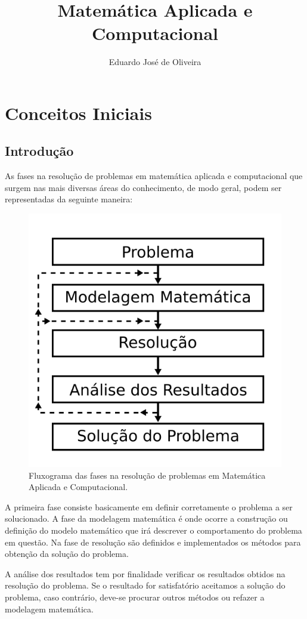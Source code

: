 \documentclass[12pt,a4paper]{book}
\title{Matemática Aplicada e Computacional}
\author{Eduardo José de Oliveira}
\numberwithin{example}{chapter}
\numberwithin{remark}{chapter}
\numberwithin{definition}{chapter}
\begin{document}
%
%
%
\chapter{Conceitos Iniciais}

\section{Introdução}

As fases na resolução de problemas em matemática aplicada e computacional que surgem nas mais diversas áreas do conhecimento, de modo geral, podem ser representadas da seguinte maneira:

\begin{figure}[h]
	\centering
	\includegraphics[scale=0.2]{figuras/figura_001}
	\caption{Fluxograma das fases na resolução de problemas em Matemática Aplicada e Computacional.}
\end{figure}

A primeira fase consiste basicamente em definir corretamente o problema a ser solucionado. A fase da modelagem matemática é onde ocorre a construção ou definição do modelo matemático que irá descrever o comportamento do problema em questão. Na fase de resolução são definidos e implementados os métodos para obtenção da solução do problema.

A análise dos resultados tem por finalidade verificar os resultados obtidos na resolução do problema. Se o resultado for satisfatório aceitamos a solução do problema, caso contrário, deve-se procurar outros métodos ou refazer a modelagem matemática.
\end{document}
